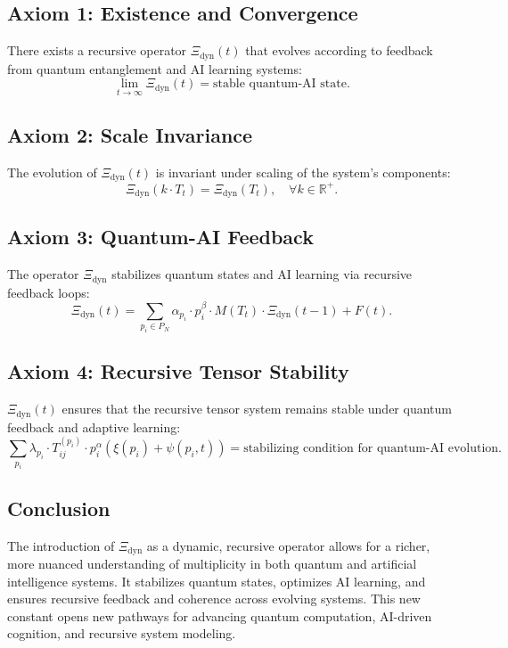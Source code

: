 \documentclass{article}
\theoremstyle{plain}
\begin{document}
\begin{itemize}
\subsection{Axiom 1: Existence and Convergence}
There exists a recursive operator $\Xi_{\text{dyn}}(t)$ that evolves according to feedback from quantum entanglement and AI learning systems:
\[
\lim_{t \to \infty} \Xi_{\text{dyn}}(t) = \text{stable quantum-AI state}.
\]

\subsection{Axiom 2: Scale Invariance}
The evolution of $\Xi_{\text{dyn}}(t)$ is invariant under scaling of the system's components:
\[
\Xi_{\text{dyn}}(k \cdot T_t) = \Xi_{\text{dyn}}(T_t), \quad \forall k \in \mathbb{R}^+.
\]

\subsection{Axiom 3: Quantum-AI Feedback}
The operator $\Xi_{\text{dyn}}$ stabilizes quantum states and AI learning via recursive feedback loops:
\[
\Xi_{\text{dyn}}(t) = \sum_{p_i \in P_N} \alpha_{p_i} \cdot p_i^{\beta} \cdot M(T_t) \cdot \Xi_{\text{dyn}}(t-1) + F(t).
\]

\subsection{Axiom 4: Recursive Tensor Stability}
$\Xi_{\text{dyn}}(t)$ ensures that the recursive tensor system remains stable under quantum feedback and adaptive learning:
\[
\sum_{p_i} \lambda_{p_i} \cdot T_{ij}^{(p_i)} \cdot p_i^{\alpha} \left( \xi(p_i) + \psi(p_i, t) \right) = \text{stabilizing condition for quantum-AI evolution}.
\]

\subsection{Conclusion}
The introduction of $\Xi_{\text{dyn}}$ as a dynamic, recursive operator allows for a richer, more nuanced understanding of multiplicity in both quantum and artificial intelligence systems. It stabilizes quantum states, optimizes AI learning, and ensures recursive feedback and coherence across evolving systems. This new constant opens new pathways for advancing quantum computation, AI-driven cognition, and recursive system modeling.





\end{itemize}
\end{document}
